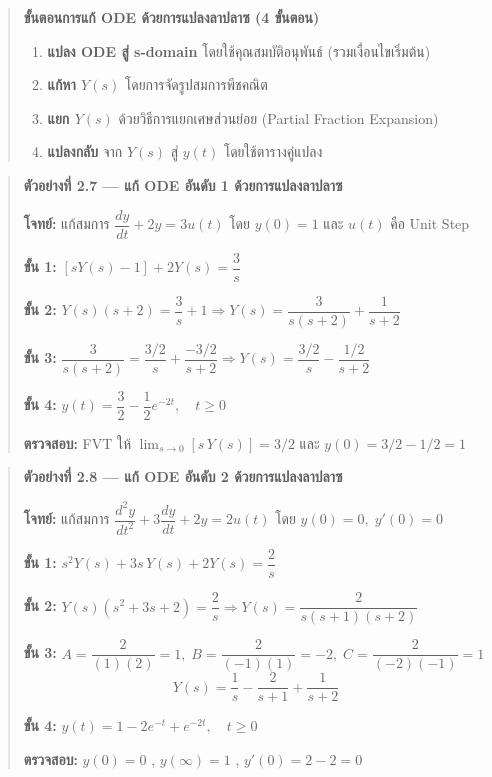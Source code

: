 \begin{quote}
\textbf{ขั้นตอนการแก้ ODE ด้วยการแปลงลาปลาซ (4 ขั้นตอน)}

\begin{enumerate}
\def\labelenumi{\arabic{enumi}.}
\tightlist
\item
  \textbf{แปลง ODE สู่ s-domain} โดยใช้คุณสมบัติอนุพันธ์ (รวมเงื่อนไขเริ่มต้น)
\item
  \textbf{แก้หา \(Y(s)\)} โดยการจัดรูปสมการพีชคณิต
\item
  \textbf{แยก \(Y(s)\)} ด้วยวิธีการแยกเศษส่วนย่อย (Partial Fraction
  Expansion)
\item
  \textbf{แปลงกลับ} จาก \(Y(s)\) สู่ \(y(t)\) โดยใช้ตารางคู่แปลง
\end{enumerate}
\end{quote}

\begin{quote}
\textbf{ตัวอย่างที่ 2.7 --- แก้ ODE อันดับ 1 ด้วยการแปลงลาปลาซ}

\textbf{โจทย์:} แก้สมการ \(\dfrac{dy}{dt} + 2y = 3u(t)\) โดย \(y(0) = 1\)
และ \(u(t)\) คือ Unit Step

\textbf{ขั้น 1:} \([sY(s) - 1] + 2Y(s) = \dfrac{3}{s}\)

\textbf{ขั้น 2:}
\(Y(s)(s+2) = \dfrac{3}{s} + 1 \Rightarrow Y(s) = \dfrac{3}{s(s+2)} + \dfrac{1}{s+2}\)

\textbf{ขั้น 3:}
\(\dfrac{3}{s(s+2)} = \dfrac{3/2}{s} + \dfrac{-3/2}{s+2} \Rightarrow Y(s) = \dfrac{3/2}{s} - \dfrac{1/2}{s+2}\)

\textbf{ขั้น 4:}
\(\boxed{y(t) = \dfrac{3}{2} - \dfrac{1}{2}e^{-2t},\quad t \geq 0}\)

\textbf{ตรวจสอบ:} FVT ให้ \(\lim_{s\to 0}[s\,Y(s)] = 3/2\) \checkmark{} และ
\(y(0) = 3/2 - 1/2 = 1\) \checkmark{}
\end{quote}

\begin{quote}
\textbf{ตัวอย่างที่ 2.8 --- แก้ ODE อันดับ 2 ด้วยการแปลงลาปลาซ}

\textbf{โจทย์:} แก้สมการ
\(\dfrac{d^2y}{dt^2} + 3\dfrac{dy}{dt} + 2y = 2u(t)\) โดย
\(y(0) = 0,\; y'(0) = 0\)

\textbf{ขั้น 1:} \(s^2 Y(s) + 3s\,Y(s) + 2Y(s) = \dfrac{2}{s}\)

\textbf{ขั้น 2:}
\(Y(s)(s^2+3s+2) = \dfrac{2}{s} \Rightarrow Y(s) = \dfrac{2}{s(s+1)(s+2)}\)

\textbf{ขั้น 3:}
\(A = \dfrac{2}{(1)(2)} = 1,\; B = \dfrac{2}{(-1)(1)} = -2,\; C = \dfrac{2}{(-2)(-1)} = 1\)
\[Y(s) = \frac{1}{s} - \frac{2}{s+1} + \frac{1}{s+2}\]

\textbf{ขั้น 4:} \(\boxed{y(t) = 1 - 2e^{-t} + e^{-2t},\quad t \geq 0}\)

\textbf{ตรวจสอบ:} \(y(0) = 0\) \checkmark, \(y(\infty) = 1\) \checkmark,
\(y'(0) = 2-2 = 0\) \checkmark
\end{quote}

